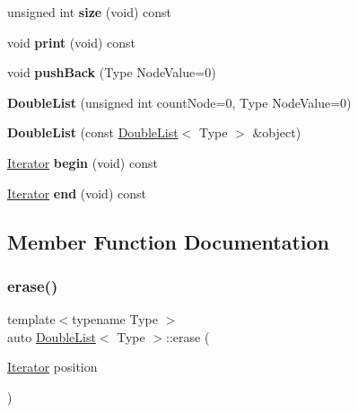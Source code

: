 \begin{DoxyCompactItemize}
\mbox{\label{classDoubleList_a4d41e1e9987abfacc315bbce462618c2}} 
unsigned int {\bfseries size} (void) const
\item 
\mbox{\label{classDoubleList_a28c311d57a9a2425a4af2691dc158aac}} 
void {\bfseries print} (void) const
\item 
\mbox{\label{classDoubleList_ad837f0847d561642747af47645952cfd}} 
void {\bfseries push\+Back} (Type Node\+Value=0)
\item 
\mbox{\label{classDoubleList_a0a5f827968e87609730b0a97dcd08105}} 
{\bfseries Double\+List} (unsigned int count\+Node=0, Type Node\+Value=0)
\item 
\mbox{\label{classDoubleList_aba69ed048141748e3269969748b12c0a}} 
{\bfseries Double\+List} (const \hyperlink{classDoubleList}{Double\+List}$<$ Type $>$ \&object)
\item 
\mbox{\label{classDoubleList_a63f8896f6da1cd0af88e837260d5bbf0}} 
\hyperlink{classDoubleList_1_1Iterator}{Iterator} {\bfseries begin} (void) const
\item 
\mbox{\label{classDoubleList_a701f4210e8adb12facfc29308971c9f6}} 
\hyperlink{classDoubleList_1_1Iterator}{Iterator} {\bfseries end} (void) const
\end{DoxyCompactItemize}


\subsection{Member Function Documentation}
\mbox{\label{classDoubleList_a4c4e2442340bd76f3f73527012cf21dd}} 
\subsubsection{\texorpdfstring{erase()}{erase()}}
{\footnotesize\ttfamily template$<$typename Type $>$ \\
auto \hyperlink{classDoubleList}{Double\+List}$<$ Type $>$\+::erase (\begin{DoxyParamCaption}\item[{\hyperlink{classDoubleList_1_1Iterator}{Iterator}}]{position }\end{DoxyParamCaption})}



